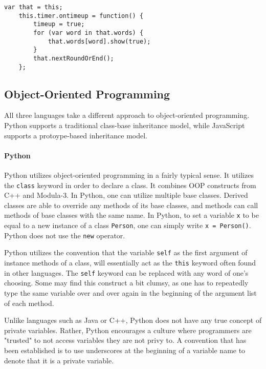 \begin{lstlisting}[caption=A closure in JavaScript]
	var that = this;
	this.timer.ontimeup = function() {
		timeup = true;
		for (var word in that.words) {
			that.words[word].show(true);
		}
		that.nextRoundOrEnd();
	};
\end{lstlisting}

\subsection{Object-Oriented Programming}
\label{oop}


All three languages take a different approach to object-oriented programming.
Python supports a traditional class-base inheritance model, while JavaScript
supports a protoype-based inheritance model. 

\paragraph{Python}

Python utilizes object-oriented programming in a fairly typical sense. It utilizes the \texttt{class} keyword in order to declare a class. It combines OOP constructs from C++ and Modula-3. In Python, one can utilize multiple base classes. Derived classes are able to override any methods of its base classes, and methods can call methods of base classes with the same name. In Python, to set a variable \texttt{x} to be equal to a new instance of a class \texttt{Person}, one can simply write \texttt{x = Person()}. Python does not use the \texttt{new} operator. \cite{python_oop}

Python utilizes the convention that the variable \texttt{self} as the first argument of instance methods of a class, will essentially act as the \texttt{this} keyword often found in other languages. The \texttt{self} keyword can be replaced with any word of one's choosing. Some may find this construct a bit clumsy, as one has to repeatedly type the same variable over and over again in the beginning of the argument list of each method.

Unlike languages such as Java or C++, Python does not have any true concept of private variables. Rather, Python encourages a culture where programmers are "trusted" to not access variables they are not privy to. A convention that has been established is to use underscores at the beginning of a variable name to denote that it is a private variable.

